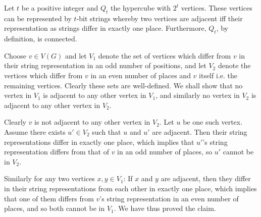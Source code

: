Let $t$ be a positive integer and $Q_t$ the hypercube with $2^t$ vertices. These
vertices can be represented by $t$-bit strings whereby two vertices are adjacent
iff their representation as strings differ in exactly one place. Furthermore,
$Q_t$, by definition, is connected.

Choose $v \in V\left(G\right)$ and let $V_1$ denote the set of vertices which differ from $v$
in their string representation in an odd number of positions, and let $V_2$ denote
the vertices which differ from $v$ in an even number of places and $v$ itself i.e. the
remaining vertices. Clearly these sets are well-defined. We shall show that no
vertex in $V_1$ is adjacent to any other vertex in $V_1$, and similarly no vertex in $V_2$
is adjacent to any other vertex in $V_2$.

Clearly $v$ is not adjacent to any other vertex in $V_2$. Let $u$ be one such vertex.
Assume there exists $u' \in V_2$ such that $u$ and $u'$ are adjacent. Then their
string representations differ in exactly one place, which implies that $u'$'s string
representation differs from that of $v$ in an odd number of places, so $u'$ cannot
be in $V_2$.

Similarly for any two vertices $x,y \in V_1$: If $x$ and $y$ are adjacent, then they
differ in their string representations from each other in exactly one place, which
implies that one of them differs from $v$'s string representation in an even number
of places, and so both cannot be in $V_1$. We have thus proved the claim.
